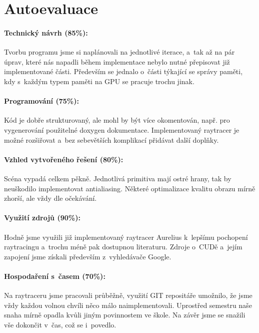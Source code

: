 \documentclass[12pt,a4paper,titlepage,final]{report}
\begin{document}
\section{Autoevaluace}

\paragraph{Technický návrh (85\%):} 
Tvorbu programu jsme si naplánovali na jednotlivé iterace, a~tak až na pár úprav, které nás napadli během implementace nebylo nutné přepisovat již implementované části. Především se jednalo o~části týkající se správy paměti, kdy s~každým typem paměti na GPU se pracuje trochu jinak.

\paragraph{Programování (75\%):}
Kód je dobře strukturovaný, ale mohl by být více okomentován, např. pro vygenerování použitelné doxygen dokumentace. 
Implementovaný raytracer je možné rozšiřovat a~bez sebevětších komplikací přidávat další doplňky.

\paragraph{Vzhled vytvořeného řešení (80\%):} 
Scéna vypadá celkem pěkně. Jednotlivá primitiva mají ostré hrany, tak by neuškodilo implementovat antialiasing. Některé optimalizace kvalitu obrazu mírně zhorší, ale vždy dle očekávání. 

\paragraph{Využití zdrojů (90\%):}
Hodně jsme využili již implementovaný raytracer Aurelius k~lepšímu pochopení raytracingu a~trochu méně pak dostupnou literaturu. Zdroje o~CUDě a~jejím zapojení jsme získali především z~vyhledávače Google.

\paragraph{Hospodaření s~časem (70\%):}
Na raytraceru jsme pracovali průběžně, využití GIT repositáře umožnilo, že jsme vždy každou volnou chvíli něco málo naimplementovali. Uprostřed semestru naše snaha mírně opadla kvůli jiným povinnostem ve škole. Na závěr jsme se snažili vše dokončit v~čas, což se i~povedlo.
\end{document}
